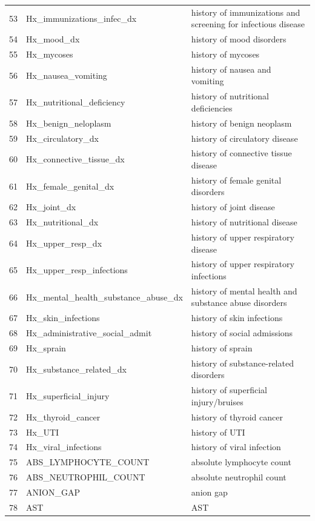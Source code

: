 \begin{longtable}{@{\extracolsep{\fill}}lll}
53 & Hx\_immunizations\_infec\_dx & history of immunizations and screening for infectious disease \\
54 & Hx\_mood\_dx & history of mood disorders \\
55 & Hx\_mycoses & history of mycoses \\
56 & Hx\_nausea\_vomiting & history of nausea and vomiting \\
57 & Hx\_nutritional\_deficiency & history of nutritional deficiencies \\
58 & Hx\_benign\_neloplasm & history of benign neoplasm \\
59 & Hx\_circulatory\_dx & history of circulatory disease \\
60 & Hx\_connective\_tissue\_dx & history of connective tissue disease \\
61 & Hx\_female\_genital\_dx & history of female genital disorders \\
62 & Hx\_joint\_dx & history of joint disease \\
63 & Hx\_nutritional\_dx & history of nutritional disease \\
64 & Hx\_upper\_resp\_dx & history of upper respiratory disease \\
65 & Hx\_upper\_resp\_infections & history of upper respiratory infections \\
66 & Hx\_mental\_health\_substance\_abuse\_dx & history of mental health and substance abuse disorders \\
67 & Hx\_skin\_infections & history of skin infections \\
68 & Hx\_administrative\_social\_admit & history of social admissions \\
69 & Hx\_sprain & history of sprain \\
70 & Hx\_substance\_related\_dx & history of substance-related disorders \\
71 & Hx\_superficial\_injury & history of superficial injury/bruises \\
72 & Hx\_thyroid\_cancer & history of thyroid cancer \\
73 & Hx\_UTI & history of UTI \\
74 & Hx\_viral\_infections & history of viral infection \\
75 & ABS\_LYMPHOCYTE\_COUNT & absolute lymphocyte count \\
76 & ABS\_NEUTROPHIL\_COUNT & absolute neutrophil count \\
77 & ANION\_GAP & anion gap \\
78 & AST & AST \\

\end{longtable}
